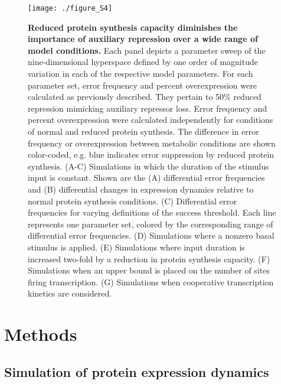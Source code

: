 \begin{figure}[h!]
\centering
\texttt{[image: ./figure\_S4]}
\caption[Robustness of ribosomopathy simulations to model assumptions.]{\textbf{Reduced protein synthesis capacity diminishes the importance of auxiliary repression over a wide range of model conditions.} Each panel depicts a parameter sweep of the nine-dimensional hyperspace defined by one order of magnitude variation in each of the respective model parameters. For each parameter set, error frequency and percent overexpression were calculated as previously described. They pertain to 50\% reduced repression mimicking auxiliary repressor loss. Error frequency and percent overexpression were calculated independently for conditions of normal and reduced protein synthesis. The difference in error frequency or overexpression between metabolic conditions are shown color-coded, e.g. blue indicates error suppression by reduced protein synthesis. (A-C) Simulations in which the duration of the stimulus input is constant. Shown are the (A) differential error frequencies and (B) differential changes in expression dynamics relative to normal protein synthesis conditions. (C) Differential error frequencies for varying definitions of the success threshold. Each line represents one parameter set, colored by the corresponding range of differential error frequencies. (D) Simulations where a nonzero basal stimulus is applied. (E) Simulations where input duration is increased two-fold by a reduction in protein synthesis capacity. (F) Simulations when an upper bound is placed on the number of sites firing transcription. (G) Simulations when cooperative transcription kinetics are considered.}
\label{fig:metabolism:figS4}
\end{figure}

\newpage

\section{Methods}

\subsection{Simulation of protein expression dynamics}
\label{metabolism:methods:simulation}

